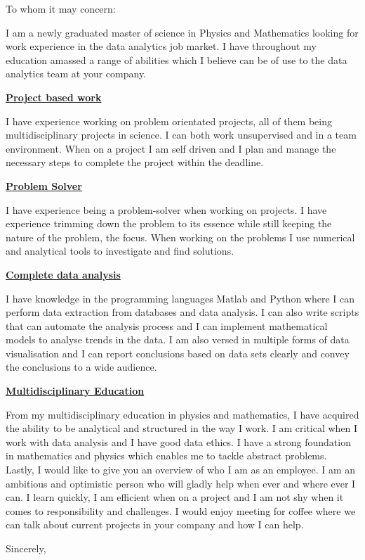 \documentclass[10pt,a4paper]{letter}
\begin{document}
\begin{letter}{}
\opening{To whom it may concern:}
I am a newly graduated master of science in Physics and Mathematics looking for work experience in the data analytics job market. I have throughout my education amassed a range of abilities which I believe can be of use to the data analytics team at your company.

\underline{\textbf{Project based work}}

I have experience working on problem orientated projects, all of them being multidisciplinary projects in science. I can both work unsupervised and in a team environment. When on a project I am self driven and I plan and manage the necessary steps to complete the project within the deadline.  

 
\underline{\textbf{Problem Solver}}

I have experience being a problem-solver when working on projects. I have experience trimming down the problem to its essence while still keeping the nature of the problem, the focus. When working on the problems I use numerical and analytical tools to investigate and find solutions.   


\underline{\textbf{Complete data analysis}}

I have knowledge in the programming languages Matlab and Python where I can perform data extraction from databases and data analysis. I can also write scripts that can automate the analysis process and I can implement mathematical models to analyse trends in the data. I am also versed in multiple forms of data visualisation and I can report conclusions based on data sets clearly and convey the conclusions to a wide audience.


\underline{\textbf{Multidisciplinary Education}}

From my multidisciplinary education in physics and mathematics, I have acquired the ability to be analytical and structured in the way I work. I am critical when I work with data analysis and I have good data ethics. I have a strong foundation in mathematics and physics which enables me to tackle abstract problems.
\\

Lastly, I would like to give you an overview of who I am as an employee. I am an ambitious and optimistic person who will gladly help when ever and where ever I can. I learn quickly, I am efficient when on a project and I am not shy when it comes to responsibility and challenges. I would enjoy meeting for coffee where we can talk about current projects in your company and how I can help.   
   



   

\closing{Sincerely,}

\end{letter}
\end{document}

